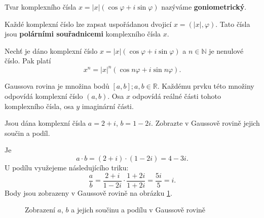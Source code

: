 \begin{definition}
    Tvar komplexního čísla $x= |x|(\cos \varphi + i\sin\varphi)$ nazýváme \textbf{goniometrický}.
\end{definition}

\begin{pozn}
    Každé komplexní číslo lze zapsat uspořádanou dvojicí $x=(|x|, \varphi).$
    Tato čísla jsou \textbf{polárními souřadnicemi} komplexního čísla $x$.
\end{pozn}

\begin{veta}
    Nechť je dáno komplexní číslo $x=|x|(\cos \varphi + i \sin \varphi)$ a $n\in \mathbb N$
    je nenulové číslo. Pak platí
    $$x^n = |x|^n (\cos n\varphi + i \sin n \varphi).$$
\end{veta}

\begin{pozn}
    Gaussova rovina je množina bodů $[a,b]; a,b \in \mathbb R$.
    Každému prvku této množiny odpovídá komplexní číslo $(a,b).$ Osa $x$ odpovídá
    reálné části tohoto komplexního čísla, osa $y$ imaginární části.
\end{pozn}

\begin{priklad}
Jsou dána komplexní čísla $a=2+i$, $b=1-2i$. Zobrazte v Gaussově rovině jejich součin a podíl.
\end{priklad}

\begin{reseni}
Je
$$
    a \cdot b = (2+i) \cdot (1-2i) = 4-3i.
$$
U podílu využejeme následujícího triku:
$$
\frac{a }{b} = \frac{2+i}{1-2i}\cdot \frac{1+2i}{1+2i} = \frac{5i}{5} = i.
$$
Body jsou zobrazeny v Gaussově rovině na obrázku \ref{komplcpr}.
\begin{figure}[h]
	\centering
	\caption{Zobrazení $a$, $b$ a jejich součinu a podílu v Gaussově rovině}
	\label{komplcpr}
\end{figure}
\end{reseni}

